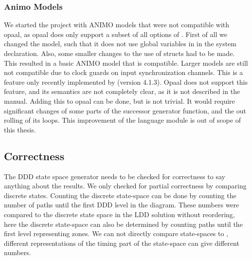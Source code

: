\subsubsection{Animo Models}
We started the project with ANIMO models that were not compatible with opaal, as opaal does only support a subset of all options of \uppaal{}. First of all we changed the model, such that it does not use global variables in in the system declaration. Also, some smaller changes to the use of structs had to be made. This resulted in a basic ANIMO model that is compatible. Larger models are still not compatible due to clock guards on input synchronization channels. This is a feature only recently implemented by \uppaal{} (version 4.1.3). Opaal does not support this feature, and its semantics are not completely clear, as it is not described in the manual. Adding this to opaal can be done, but is not trivial. It would require significant changes of some parts of the successor generator function, and the out rolling of its loops. This improvement of the language module is out of scope of this thesis.  

\subsection{Correctness}
The DDD state space generator needs to be checked for correctness to say anything about the results. We only checked for partial correctness by comparing discrete states. Counting the discrete state-space can be done by counting the number of paths until the first DDD level in the diagram. These numbers were compared to the discrete state space in the LDD solution without reordering, here the discrete state-space can also be determined by counting paths until the first level representing zones. We can not directly compare state-spaces to \uppaal{}, different representations of the timing part of the state-space can give different numbers.
